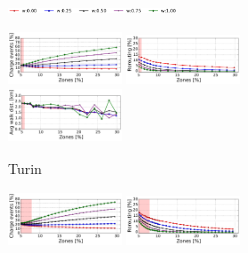 \begin{figure}[t!]
    \begin{center}
        \begin{subfigure}{\textwidth}
		    \begin{center}
       		    \includegraphics[width=0.49\textwidth]{figures/legenda.pdf}
                \vspace{-0.1cm}
       	    \end{center}
            \includegraphics[width=0.33\textwidth]{figures/cut_Torino_AmountRechargePercVsZones_Policy_44_tt-25_100_4.pdf}
            \includegraphics[width=0.33\textwidth]{figures/cut_Torino_ReroutePercVsZones_Policy_44_tt-25_100_4.pdf}
            \includegraphics[width=0.33\textwidth]{figures/cut_Torino_AvgWalkedDistanceVsZones_Policy_44_tt-25_100_4.pdf}
            \caption{Turin}
            \label{fig:6_7_zone_vs_metric_torino}
        \end{subfigure}
         \begin{subfigure}{\textwidth}
            \includegraphics[width=0.33\textwidth]{figures/cut_Milano_AmountRechargePercVsZones_Policy_44_tt-25_100_4.pdf}
            \includegraphics[width=0.33\textwidth]{figures/cut_Milano_ReroutePercVsZones_Policy_44_tt-25_100_4.pdf}

\end{subfigure}
\end{center}
\end{figure}
